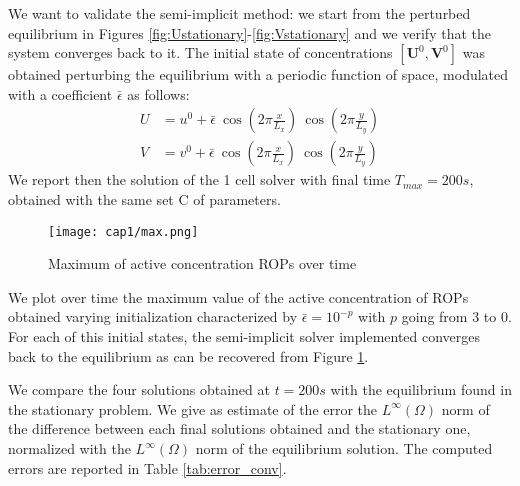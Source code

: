 We want to validate the semi-implicit method: we start from the perturbed equilibrium in Figures \ref{fig:Ustationary}-\ref{fig:Vstationary} and we verify that the system converges back to it. The initial state of concentrations $\left[\mathbf{U}^{0}, \mathbf{V}^{0} \right]$ was obtained perturbing the equilibrium with a periodic function of space, modulated with a coefficient $\bar{\epsilon}$ as follows:
\begin{equation} \label{eq:pert}\begin{aligned}
  U & = u^0 + \bar{\epsilon} \ \cos(2\pi\frac{x}{L_x}) \ \cos(2\pi\frac{y}{L_y}) \\
  V & = v^0 + \bar{\epsilon} \ \cos(2\pi\frac{x}{L_x}) \ \cos(2\pi\frac{y}{L_y})
\end{aligned} \end{equation}
We report then the solution of the 1 cell solver with final time $T_{max} = 200s$, obtained with the same set C of parameters.
\begin{figure}
  \centering
  \texttt{[image: cap1/max.png]}
  \caption{Maximum of active concentration ROPs over time}
  \label{fig:max}
\end{figure}
We plot over time the maximum value of the active concentration of ROPs obtained varying initialization characterized by $\bar{\epsilon} = 10^{-p}$ with $p$ going from 3 to 0. For each of this initial states, the semi-implicit solver implemented converges back to the equilibrium as can be recovered from Figure \ref{fig:max}.

We compare the four solutions obtained at $t = 200s$ with the equilibrium found in the stationary problem. We give as estimate of the error the $L^{\infty}\left(\Omega\right)$ norm of the difference between each final solutions obtained and the stationary one, normalized with the $L^{\infty}\left(\Omega\right)$ norm of the equilibrium solution. The computed errors are reported in Table \ref{tab:error_conv}.

